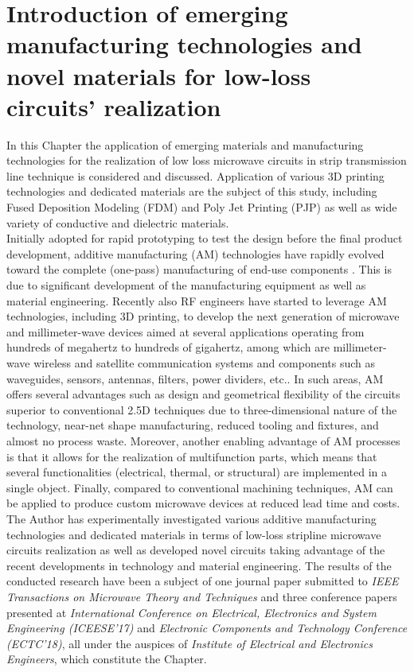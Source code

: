 \chapter{Introduction of emerging manufacturing technologies and novel materials for low-loss circuits' realization}\label{emerging}

\indent In this Chapter the application of emerging materials and manufacturing technologies for the realization of low loss microwave circuits in strip transmission line technique is considered and discussed. Application of various 3D printing technologies and dedicated materials are the subject of this study, including Fused Deposition Modeling (FDM) and Poly Jet Printing (PJP) as well as wide variety of conductive and dielectric materials.
\\
\indent Initially adopted for rapid prototyping to test the design before the final product development, additive manufacturing (AM) technologies have rapidly evolved toward the complete (one-pass) manufacturing of end-use components \cite{pieee_sorrentino}. This is due to significant development of the manufacturing equipment as well as material engineering. Recently also RF engineers have started to leverage AM technologies, including 3D printing, to develop the next generation of microwave and millimeter-wave devices aimed at several applications operating from hundreds of megahertz to hundreds of gigahertz, among which are millimeter-wave wireless and satellite communication systems and components such as waveguides, sensors, antennas, filters, power dividers, etc.. In such areas, AM offers several advantages such as design and geometrical flexibility of the circuits superior to conventional 2.5D techniques due to three-dimensional nature of the technology, near-net shape manufacturing, reduced tooling and fixtures, and almost no process waste. Moreover, another enabling advantage of AM processes is that it allows for the realization of multifunction parts, which means that several functionalities (electrical, thermal, or structural) are implemented in a single object. Finally, compared to conventional machining techniques, AM can be applied to produce custom microwave devices at reduced lead time and costs. 
\\
\indent The Author has experimentally investigated various additive manufacturing technologies and dedicated materials in terms of low-loss stripline microwave circuits realization as well as developed novel circuits taking advantage of the recent developments in technology and material engineering. The results of the conducted research have been a subject of one journal paper submitted to \textit{IEEE Transactions on Microwave Theory and Techniques} and three conference papers presented at \textit{International Conference on Electrical, Electronics and System Engineering (ICEESE'17)} and \textit{Electronic Components and Technology Conference (ECTC'18)}, all under the auspices of \textit{Institute of Electrical and Electronics Engineers}, which constitute the Chapter.
